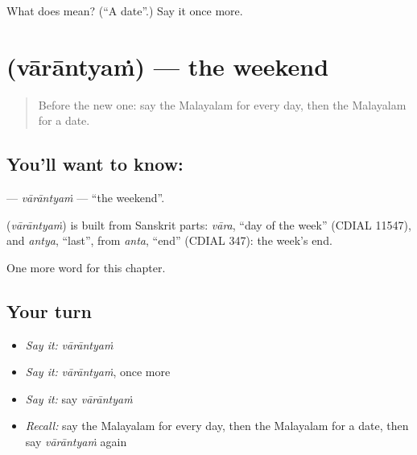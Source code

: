 \begin{tcolorbox}[breakable,colback=teal!4,colframe=teal!35!black,title={Before you move on}]
What does  mean? (\textquotedblleft{}A date\textquotedblright{}.) Say it once more.
\end{tcolorbox}
\section[\texorpdfstring{\ml{വാരാന്ത്യം} (vārāntyaṁ)}{വാരാന്ത്യം (vārāntyaṁ)}]{ (vārāntyaṁ) — the weekend}

\label{lesson:ML-C195-varantyam}



\begin{quote}
Before the new one: say the Malayalam for every day, then the Malayalam for a date.
\end{quote}

\subsection*{You'll want to know: }
\textbf{} — \emph{vārāntyaṁ} — \textquotedblleft{}the weekend\textquotedblright{}.

\begin{cousinweb}
\textbf{} (\emph{vārāntyaṁ}) is built from Sanskrit parts: \emph{vāra}, \textquotedblleft{}day of the week\textquotedblright{} (CDIAL 11547), and \emph{antya}, \textquotedblleft{}last\textquotedblright{}, from \emph{anta}, \textquotedblleft{}end\textquotedblright{} (CDIAL 347): the week's end.
\end{cousinweb}

\begin{grammarlens}[title={What you've built}]
One more word for this chapter.
\end{grammarlens}

\subsection*{Your turn}
\begin{itemize}
\raggedright
  \item \emph{Say it:} \emph{vārāntyaṁ}
  \item \emph{Say it:} \emph{vārāntyaṁ}, once more
  \item \emph{Say it:} say \emph{vārāntyaṁ}
  \item \emph{Recall:} say the Malayalam for every day, then the Malayalam for a date, then say \emph{vārāntyaṁ} again
\end{itemize}

